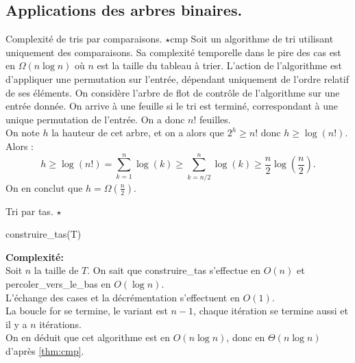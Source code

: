 \documentclass[french, 11pt]{article}
\begin{document}
\subsection{Applications des arbres binaires.}

\begin{thm}{Complexité de tris par comparaisons. $\star$}{cmp}
    Soit un algorithme de tri utilisant uniquement des comparaisons. Sa complexité temporelle dans le pire des cas est en $\Omega(n\log n)$ où $n$ est la taille du tableau à trier.
    \tcblower
    L'action de l'algorithme est d'appliquer une permutation sur l'entrée, dépendant uniquement de l'ordre relatif de ses éléments.
    On considère l'arbre de flot de contrôle de l'algorithme sur une entrée donnée. On arrive à une feuille si le tri est terminé, correspondant à une unique permutation de l'entrée. On a donc $n!$ feuilles.\\
    On note $h$ la hauteur de cet arbre, et on a alors que $2^h \geq n!$ donc $h\geq\log(n!)$. Alors :
    \begin{equation*}
        h\geq\log(n!)=\sum_{k=1}^n\log(k)\geq\sum_{k=n/2}^n\log(k)\geq\frac{n}{2}\log\left(\frac{n}{2}\right).
    \end{equation*}
    On en conclut que $h=\Omega(\frac{n}{2})$.
\end{thm}

\begin{defi}{Tri par tas. $\star$}{}
    \begin{algorithm}[H]
        \caption{Tri par tas}
        construire\_tas(T)\\
    \end{algorithm}
    \textbf{Complexité:}\\
    Soit $n$ la taille de $T$. On sait que construire\_tas s'effectue en $O(n)$ et percoler\_vers\_le\_bas en $O(\log n)$.\\
    L'échange des cases et la décrémentation s'effectuent en $O(1)$.\\
    La boucle for se termine, le variant est $n-1$, chaque itération se termine aussi et il y a $n$ itérations.\\
    On en déduit que cet algorithme est en $O(n\log n)$, donc en $\Theta(n\log n)$ d'après \ref{thm:cmp}.
\end{defi}
\end{document}
